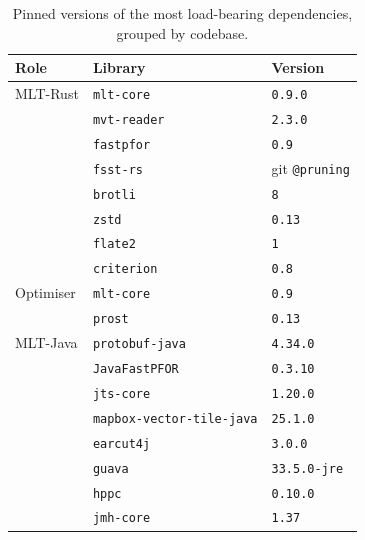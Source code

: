 \begin{table}[htbp]
\centering \small
\begin{tabular}{@{}l l l@{}}
\toprule
\textbf{Role} & \textbf{Library} & \textbf{Version} \\
\midrule
\acs{MLT}-Rust               & \texttt{mlt-core}                & \texttt{0.9.0} \\
                                       & \texttt{mvt-reader}              & \texttt{2.3.0} \\
                                       & \texttt{fastpfor}                & \texttt{0.9} \\
                                       & \texttt{fsst-rs}                 & git \texttt{@pruning} \\
                                       & \texttt{brotli}                  & \texttt{8} \\
                                       & \texttt{zstd}                    & \texttt{0.13} \\
                                       & \texttt{flate2}                  & \texttt{1} \\
                                       & \texttt{criterion}               & \texttt{0.8} \\
\midrule
Optimiser                    & \texttt{mlt-core}                & \texttt{0.9} \\
                                       & \texttt{prost}                   & \texttt{0.13} \\
\midrule
\ac{MLT}-Java                          & \texttt{protobuf-java}           & \texttt{4.34.0} \\
                                       & \texttt{JavaFastPFOR}            & \texttt{0.3.10} \\
                                       & \texttt{jts-core}                & \texttt{1.20.0} \\
                                       & \texttt{mapbox-vector-tile-java} & \texttt{25.1.0} \\
                                       & \texttt{earcut4j}                & \texttt{3.0.0} \\
                                       & \texttt{guava}                   & \texttt{33.5.0-jre} \\
                                       & \texttt{hppc}                    & \texttt{0.10.0} \\
                                       & \texttt{jmh-core}                & \texttt{1.37} \\
\bottomrule
\end{tabular}
\caption{
Pinned versions of the most load-bearing dependencies, grouped by codebase.}
\label{tab:bench_libs}
\end{table}

